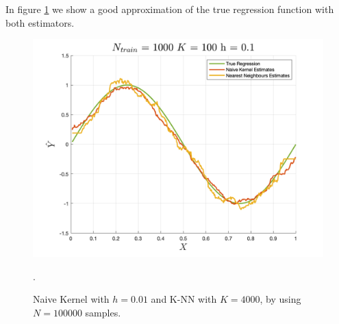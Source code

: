 In figure \ref*{fig:non_parametric_regression_7} we show a good approximation of the true regression function with both estimators.
\begin{figure}[H]
    \centering
    \includegraphics[width=\textwidth]{./figures/appendix_a/figure_20.png}
    \caption{Naive Kernel with $h=0.01$ and K-NN with $K=4000$, by using $N=100000$ samples.}.
    \label{fig:non_parametric_regression_7}
\end{figure}

